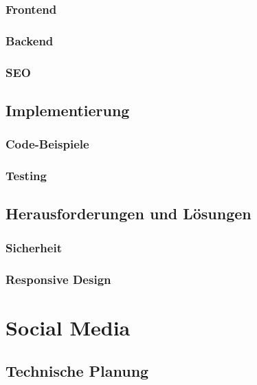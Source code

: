     \subsubsection{Frontend}

    \subsubsection{Backend}

    \subsubsection{SEO}

  \subsection{Implementierung}

    \subsubsection{Code-Beispiele}

    \subsubsection{Testing}

  \subsection{Herausforderungen und Lösungen}

    \subsubsection{Sicherheit}

    \subsubsection{Responsive Design}

\section{Social Media}

  \subsection{Technische Planung}


